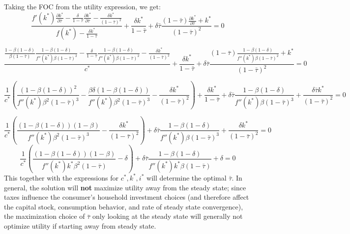 \documentclass[10pt,letter]{article}
\begin{document}
Taking the FOC from the utility expression, we get:
\[ \frac{f'(k^*)\frac{\partial k^*}{\partial \bar{\tau}} - \frac{\delta }{1 - \bar{\tau}} \frac{\partial k^*}{\partial \bar{\tau}} - \frac{\delta k^*}{(1-\bar{\tau})^2}}{f(k^*) - \frac{\delta k^*}{1 - \bar{\tau}}} + \frac{\delta k^*}{1 - \bar{\tau}} + \delta \bar{\tau}\frac{(1 - \bar{\tau})\frac{\partial k^*}{\partial \bar{\tau}} + k^*}{(1 - \bar{\tau})^2} = 0 \]

\[ \frac{\frac{1 - \beta(1-\delta)}{\beta(1-\bar{\tau})}\frac{1 - \beta(1-\delta)}{f''(k^*)\beta(1-\bar{\tau})^2} - \frac{\delta }{1 - \bar{\tau}} \frac{1 - \beta(1-\delta)}{f''(k^*)\beta(1-\bar{\tau})^2} - \frac{\delta k^*}{(1-\bar{\tau})^2}}{c^*} + \frac{\delta k^*}{1 - \bar{\tau}}+ \delta \bar{\tau}\frac{(1 - \bar{\tau})\frac{1 - \beta(1-\delta)}{f''(k^*)\beta(1-\bar{\tau})^2} + k^*}{(1 - \bar{\tau})^2} = 0 \]

\[ \frac{1}{c^*}\left(\frac{(1 - \beta(1-\delta))^2}{f''(k^*)\beta^2(1-\bar{\tau})^3} -  \frac{\beta\delta(1 - \beta(1-\delta))}{f''(k^*)\beta^2(1-\bar{\tau})^3} - \frac{\delta k^*}{(1-\bar{\tau})^2}\right) + \frac{\delta k^*}{1 - \bar{\tau}}+ \delta \bar{\tau}\frac{1 - \beta(1-\delta) }{f''(k^*)\beta(1 - \bar{\tau})^3} + \frac{\delta \bar{\tau} k^* }{(1-\bar{\tau})^2} = 0 \]

\[ \frac{1}{c^*}\left(\frac{(1 - \beta(1-\delta))(1-\beta)}{f''(k^*)\beta^2(1-\bar{\tau})^3} - \frac{\delta k^*}{(1-\bar{\tau})^2}\right) + \delta \bar{\tau}\frac{1 - \beta(1-\delta) }{f''(k^*)\beta(1 - \bar{\tau})^3} + \frac{\delta k^* }{(1-\bar{\tau})^2} = 0 \]
\[ \frac{1}{c^*}\left(\frac{(1 - \beta(1-\delta))(1-\beta)}{f''(k^*)k^*\beta^2(1-\bar{\tau})} - \delta\right) + \delta \bar{\tau}\frac{1 - \beta(1-\delta) }{f''(k^*)k^*\beta(1 - \bar{\tau})} + \delta = 0 \]
This together with the expressions for $c^*, k^*, i^*$ will determine the optimal $\bar{\tau}$. In general, the solution will \textbf{not} maximize utility away from the steady state; since taxes influence the consumer's household investment choices (and therefore affect the capital stock, consumption behavior, and rate of steady state convergence), the maximization choice of $\bar{\tau}$ only looking at the steady state will generally not optimize utility if starting away from steady state.
\end{document}
